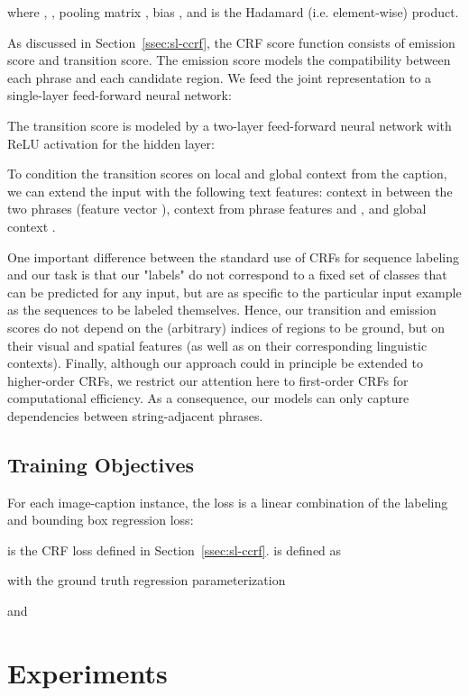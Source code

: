 \documentclass[11pt,a4paper]{article}
\begin{document}
where , , pooling matrix , bias , and  is the Hadamard (i.e. element-wise) product. 

As discussed in Section~\ref{ssec:sl-ccrf}, the CRF score function consists of emission score and transition score. The emission score  models the compatibility between each phrase and each candidate region. We feed the joint representation to a single-layer feed-forward neural network: 

The transition score  is modeled by a two-layer feed-forward neural network with ReLU activation for the hidden layer: 

To condition the transition scores on local and global context from the caption, we can extend the input  with the following text features: context in between the two phrases (feature vector ), context from phrase features  and , and global context . 

One important difference between the standard use of CRFs for sequence labeling and our task is that our "labels" do not correspond to a fixed set of classes that can be predicted for any input, but are as specific to the particular input example as the sequences to be labeled themselves. Hence, our transition and emission scores do not depend on the (arbitrary) indices of regions to be ground, but on their visual and spatial features (as well as on their corresponding linguistic contexts). Finally, although our approach could in principle be extended to higher-order CRFs, we restrict our attention here to first-order CRFs for computational efficiency. As a consequence, our models can only capture dependencies between string-adjacent phrases. 

\subsection{Training Objectives}

For each image-caption instance, the loss is a linear combination of the labeling and bounding box regression loss: 

 is the CRF loss defined in Section~\ref{ssec:sl-ccrf}.   \cite{DBLP:journals/pami/RenHG017} is defined as

with the ground truth regression parameterization

and 


\section{Experiments}
\label{sec:experiments}
\end{document}
